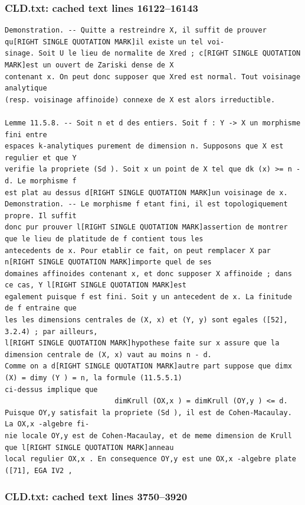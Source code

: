 \documentclass[
  11pt,
]{article}
\begin{document}
\subsubsection{CLD.txt: cached text lines
16122--16143}\label{cld.txt-cached-text-lines-1612216143}

\begin{lstlisting}
Demonstration. -- Quitte a restreindre X, il suffit de prouver qu[RIGHT SINGLE QUOTATION MARK]il existe un tel voi-
sinage. Soit U le lieu de normalite de Xred ; c[RIGHT SINGLE QUOTATION MARK]est un ouvert de Zariski dense de X
contenant x. On peut donc supposer que Xred est normal. Tout voisinage analytique
(resp. voisinage affinoide) connexe de X est alors irreductible.

Lemme 11.5.8. -- Soit n et d des entiers. Soit f : Y -> X un morphisme fini entre
espaces k-analytiques purement de dimension n. Supposons que X est regulier et que Y
verifie la propriete (Sd ). Soit x un point de X tel que dk (x) >= n - d. Le morphisme f
est plat au dessus d[RIGHT SINGLE QUOTATION MARK]un voisinage de x.
Demonstration. -- Le morphisme f etant fini, il est topologiquement propre. Il suffit
donc pur prouver l[RIGHT SINGLE QUOTATION MARK]assertion de montrer que le lieu de platitude de f contient tous les
antecedents de x. Pour etablir ce fait, on peut remplacer X par n[RIGHT SINGLE QUOTATION MARK]importe quel de ses
domaines affinoides contenant x, et donc supposer X affinoide ; dans ce cas, Y l[RIGHT SINGLE QUOTATION MARK]est
egalement puisque f est fini. Soit y un antecedent de x. La finitude de f entraine que
les les dimensions centrales de (X, x) et (Y, y) sont egales ([52], 3.2.4) ; par ailleurs,
l[RIGHT SINGLE QUOTATION MARK]hypothese faite sur x assure que la dimension centrale de (X, x) vaut au moins n - d.
Comme on a d[RIGHT SINGLE QUOTATION MARK]autre part suppose que dimx (X) = dimy (Y ) = n, la formule (11.5.5.1)
ci-dessus implique que
                          dimKrull (OX,x ) = dimKrull (OY,y ) <= d.
Puisque OY,y satisfait la propriete (Sd ), il est de Cohen-Macaulay. La OX,x -algebre fi-
nie locale OY,y est de Cohen-Macaulay, et de meme dimension de Krull que l[RIGHT SINGLE QUOTATION MARK]anneau
local regulier OX,x . En consequence OY,y est une OX,x -algebre plate ([71], EGA IV2 ,
\end{lstlisting}

\subsubsection{CLD.txt: cached text lines
3750--3920}\label{cld.txt-cached-text-lines-37503920}
\end{document}
